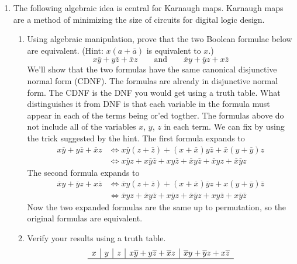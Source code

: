 \documentclass[12pt]{amsart}
\newcommand{\ov}[1]{\overline{#1}}
\begin{document}
\begin{enumerate}
\item  The following algebraic idea is central for Karnaugh maps.
    Karnaugh maps are a method of minimizing the size of circuits for
    digital logic design.
    \begin{enumerate}
    \item
        Using algebraic manipulation, prove that the two Boolean formulae
        below are equivalent. (Hint: $x(a+ \overline{a})$ is equivalent
        to $x$.)
        \[
        x\overline{y} + y\overline{z} +  \overline{x}z \qquad \textrm{and} \qquad
         \overline{x}y +  \overline{y}z + x\overline{z}
        \]
    We'll show that the two formulas have the same canonical disjunctive normal form (CDNF).
    The formulas are already in disjunctive normal form. The CDNF is the DNF
    you would get using a truth table. What distinguishes it from DNF is that each
    variable in the formula must appear in each of the terms being or'ed togther.
    The formulas above do not include all of the variables $x$, $y$, $z$ in each term.
    We can fix by using the trick suggested by the hint. The first formula expands to
    \begin{align*}
        x\overline{y} + y\overline{z} +  \overline{x}z
            & \Leftrightarrow  x \overline{y}(z + \overline{z})
                + (x + \overline{x}) y \overline{z}
                + \overline{x}(y + \overline{y})z \\
            & \Leftrightarrow x \overline{y} z +  x \overline{y} \overline{z}
                + x y \overline{z} + \overline{x} y \overline{z}
                + \overline{x} y z + \overline{x} \overline{y} z
    \end{align*}
    The second formula expands to
    \begin{align*}
         \ov{x}y +  \ov{y}z + x\ov{z}
            & \Leftrightarrow \ov{x}y (z  +  \ov{z})
                + ( x + \ov{x}) \ov{y}z + x(y + \ov{y})\overline{z}\\
            & \Leftrightarrow \ov{x}y z + \ov{x} y \ov{z} + x \ov{y} z + \ov{x} \ov{y} z
             + x y \ov{z} + x \ov{y} \ov{z}
    \end{align*}
    Now the two expanded formulas are the same up to permutation, so the original formulas are equivalent.
    \item Verify your results using a truth table.\\
     \[
    \begin{array}{c|c|c|c|c}
        x   &   y   &   z   &   x\ov{y} + y\ov{z} +  \ov{x}z  & \ov{x}y +  \ov{y}z + x\ov{z} \\\hline

\end{array}\]
\end{enumerate}
\end{enumerate}
\end{document}
